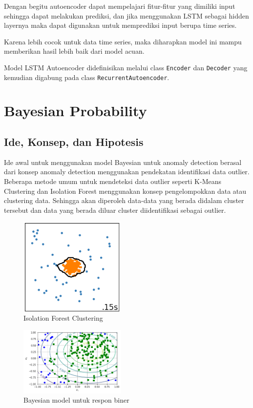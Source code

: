 Dengan begitu autoencoder dapat mempelajari fitur-fitur yang dimiliki input sehingga dapat melakukan prediksi, dan jika menggunakan LSTM sebagai hidden layernya maka dapat digunakan untuk memprediksi input berupa time series.

Karena lebih cocok untuk data time series, maka diharapkan model ini mampu memberikan hasil lebih baik dari model acuan.

Model LSTM Autoencoder didefinisikan melalui class \texttt{Encoder} dan \texttt{Decoder} yang kemudian digabung pada class \texttt{RecurrentAutoencoder}.

\section{Bayesian Probability}
\subsection{Ide, Konsep, dan Hipotesis}

Ide awal untuk menggunakan model Bayesian untuk anomaly detection berasal dari konsep anomaly detection menggunakan pendekatan identifikasi data outlier. Beberapa metode umum untuk mendeteksi data outlier seperti K-Means Clustering dan Isolation Forest menggunakan konsep pengelompokkan data atau clustering data. Sehingga akan diperoleh data-data yang berada didalam cluster tersebut dan data yang berada diluar cluster diidentifikasi sebagai outlier.

\begin{figure}[h]
    \centering
    \includegraphics[width=200px]{resources/Bayes/isoforest.png}
    \caption{Isolation Forest Clustering}
\end{figure}

\begin{figure}[h]
    \centering
    \includegraphics[width=200px]{resources/Bayes/bayes_model.png}
    \caption{Bayesian model untuk respon biner}
\end{figure}

